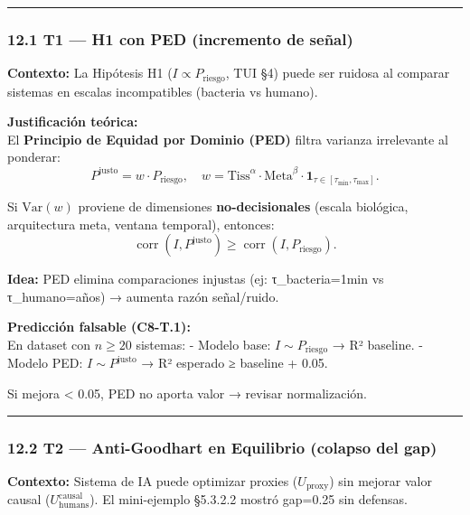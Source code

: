 \begin{center}\rule{0.5\linewidth}{0.5pt}\end{center}

\subsubsection{12.1 T1 --- H1 con PED (incremento de
señal)}\label{t1-h1-con-ped-incremento-de-seuxf1al}

\textbf{Contexto:} La Hipótesis H1 (\(I \propto P_{\text{riesgo}}\), TUI
§4) puede ser ruidosa al comparar sistemas en escalas incompatibles
(bacteria vs humano).

\textbf{Justificación teórica:}\\
El \textbf{Principio de Equidad por Dominio (PED)} filtra varianza
irrelevante al ponderar: \[
P^{\text{justo}} = w \cdot P_{\text{riesgo}}, \quad w = \text{Tiss}^\alpha \cdot \text{Meta}^\beta \cdot \mathbf{1}_{\tau \in [\tau_{\min}, \tau_{\max}]}.
\]

Si \(\text{Var}(w)\) proviene de dimensiones \textbf{no-decisionales}
(escala biológica, arquitectura meta, ventana temporal), entonces: \[
\operatorname{corr}(I, P^{\text{justo}}) \geq \operatorname{corr}(I, P_{\text{riesgo}}).
\]

\textbf{Idea:} PED elimina comparaciones injustas (ej: τ\_bacteria=1min
vs τ\_humano=años) → aumenta razón señal/ruido.

\textbf{Predicción falsable (C8-T.1):}\\
En dataset con \(n \geq 20\) sistemas: - Modelo base:
\(I \sim P_{\text{riesgo}}\) → R² baseline. - Modelo PED:
\(I \sim P^{\text{justo}}\) → R² esperado ≥ baseline + 0.05.

Si mejora \textless{} 0.05, PED no aporta valor → revisar normalización.

\begin{center}\rule{0.5\linewidth}{0.5pt}\end{center}

\subsubsection{12.2 T2 --- Anti-Goodhart en Equilibrio (colapso del
gap)}\label{t2-anti-goodhart-en-equilibrio-colapso-del-gap}

\textbf{Contexto:} Sistema de IA puede optimizar proxies
(\(U_{\text{proxy}}\)) sin mejorar valor causal
(\(U_{\text{humans}}^{\text{causal}}\)). El mini-ejemplo §5.3.2.2 mostró
gap=0.25 sin defensas.

